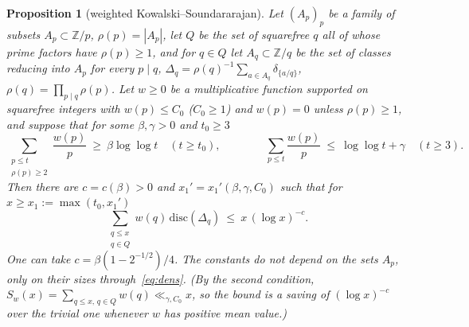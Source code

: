 \documentclass[11pt,a4paper]{article}
\newtheorem{proposition}[theorem]{Proposition}
\theoremstyle{remark}\newtheorem{remark}[theorem]{Remark}
\newcommand{\Z}{\mathbb{Z}}\newcommand{\Q}{\mathbb{Q}}\newcommand{\F}{\mathbb{F}}\newcommand{\R}{\mathbb{R}}
\begin{document}
\begin{proposition}[weighted Kowalski--Soundararajan]\label{prop:KSw}
Let $(A_p)_p$ be a family of subsets $A_p\subset\Z/p$, $\rho(p)=|A_p|$, let $Q$ be the set of squarefree $q$ all
of whose prime factors have $\rho(p)\ge1$, and for $q\in Q$ let $A_q\subset\Z/q$ be the set of classes reducing into
$A_p$ for every $p\mid q$, $\Delta_q=\rho(q)^{-1}\sum_{a\in A_q}\delta_{\{a/q\}}$, $\rho(q)=\prod_{p\mid q}\rho(p)$. Let $w\ge0$ be a
multiplicative function supported on squarefree integers with $w(p)\le C_0$ ($C_0\ge1$) and $w(p)=0$ unless
$\rho(p)\ge1$, and suppose that for some $\beta,\gamma>0$ and $t_0\ge3$
\begin{equation}\label{eq:dens}
\sum_{\substack{p\le t\\ \rho(p)\ge2}}\frac{w(p)}{p}\ \ge\ \beta\log\log t\quad(t\ge t_0),\qquad\qquad
\sum_{p\le t}\frac{w(p)}{p}\ \le\ \log\log t+\gamma\quad(t\ge3).
\end{equation}
Then there are $c=c(\beta)>0$ and $x_1'=x_1'(\beta,\gamma,C_0)$ such that for $x\ge x_1:=\max(t_0,x_1')$
\[
\sum_{\substack{q\le x\\ q\in Q}}w(q)\,\mathrm{disc}(\Delta_q)\ \le\ x\,(\log x)^{-c}.
\]
One can take $c=\beta(1-2^{-1/2})/4$. The constants do not depend on the sets $A_p$, only on their sizes
through~\eqref{eq:dens}. (By the second condition, $S_w(x)=\sum_{q\le x,\,q\in Q}w(q)\ll_{\gamma,C_0}x$, so the bound
is a saving of $(\log x)^{-c}$ over the trivial one whenever $w$ has positive mean value.)
\end{proposition}
\end{document}
